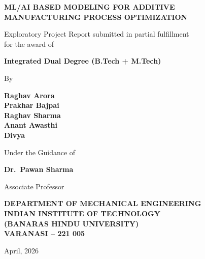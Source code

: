 \documentclass[12pt,a4paper]{report}
\begin{document}
\begin{titlepage}
  \centering
  \vspace*{0.5cm}

  {\Large\bfseries ML/AI BASED MODELING FOR ADDITIVE\\[4pt]
   MANUFACTURING PROCESS OPTIMIZATION}

  \vspace{0.6cm}
  {\large Exploratory Project Report submitted in partial fulfillment\\
  for the award of}

  \vspace{0.4cm}
  {\large\bfseries Integrated Dual Degree (B.Tech + M.Tech)}

  \vspace{0.4cm}
  {By}

  \vspace{0.4cm}
  {\large\bfseries
    Raghav Arora\\[3pt]
    Prakhar Bajpai\\[3pt]
    Raghav Sharma\\[3pt]
    Anant Awasthi\\[3pt]
    Divya
  }

  \vspace{0.6cm}
  {Under the Guidance of}

  \vspace{0.3cm}
  {\large\bfseries Dr.\ Pawan Sharma}

  \vspace{0.3cm}
  {Associate Professor}

  \vspace{1cm}

  \vspace{0.8cm}
  {\bfseries DEPARTMENT OF MECHANICAL ENGINEERING\\[3pt]
   INDIAN INSTITUTE OF TECHNOLOGY\\[3pt]
   (BANARAS HINDU UNIVERSITY)\\[3pt]
   VARANASI -- 221 005}

  \vspace{0.4cm}
  {April, 2026}
\end{titlepage}
\end{document}
